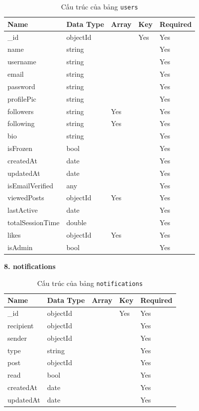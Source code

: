 \begin{table}[H]
\centering
\renewcommand{\arraystretch}{1.3}
\begin{tabular}{|p{4cm}|p{4cm}|p{2cm}|p{2cm}|p{2cm}|}
\hline
\textbf{Name} & \textbf{Data Type} & \textbf{Array} & \textbf{Key} & \textbf{Required} \\
\hline
\_id             & objectId &     & Yes & Yes \\
name            & string   &     &     & Yes \\
username        & string   &     &     & Yes \\
email           & string   &     &     & Yes \\
password        & string   &     &     & Yes \\
profilePic      & string   &     &     & Yes \\
followers       & string   & Yes &     & Yes \\
following       & string   & Yes &     & Yes \\
bio             & string   &     &     & Yes \\
isFrozen        & bool     &     &     & Yes \\
createdAt       & date     &     &     & Yes \\
updatedAt       & date     &     &     & Yes \\
isEmailVerified & any      &     &     & Yes \\
viewedPosts     & objectId & Yes &     & Yes \\
lastActive      & date     &     &     & Yes \\
totalSessionTime & double   &     &     & Yes \\
likes           & objectId & Yes &     & Yes \\
isAdmin         & bool     &     &     & Yes \\
\hline
\end{tabular}
\caption{Cấu trúc của bảng \texttt{users}}
\end{table}
\newpage
\textbf{8. notifications}

\begin{table}[H]
\centering
\renewcommand{\arraystretch}{1.3}
\begin{tabular}{|p{4cm}|p{4cm}|p{2cm}|p{2cm}|p{2cm}|}
\hline
\textbf{Name} & \textbf{Data Type} & \textbf{Array} & \textbf{Key} & \textbf{Required} \\
\hline
\_id         & objectId &  & Yes & Yes \\
recipient    & objectId &  &     & Yes \\
sender       & objectId &  &     & Yes \\
type         & string   &  &     & Yes \\
post         & objectId &  &     & Yes \\
read         & bool     &  &     & Yes \\
createdAt    & date     &  &     & Yes \\
updatedAt    & date     &  &     & Yes \\
\hline
\end{tabular}
\caption{Cấu trúc của bảng \texttt{notifications}}
\end{table}

